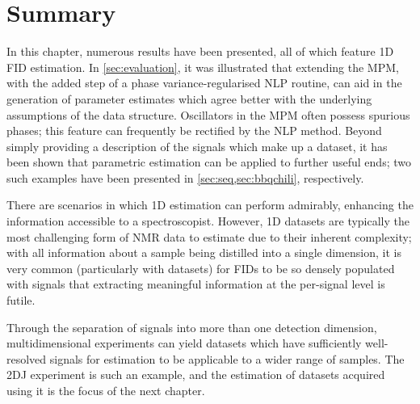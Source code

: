 \section{Summary}

In this chapter, numerous results have been presented, all of which feature
\ac{1D} \ac{FID} estimation.
In \cref{sec:evaluation}, it was illustrated that extending the \ac{MPM}, with
the added step of a phase variance-regularised \ac{NLP} routine, can
aid in the generation of parameter estimates which agree better with the
underlying assumptions of the data structure. Oscillators in the \ac{MPM} often
possess spurious phases; this feature can frequently be rectified by the
\ac{NLP} method. Beyond simply providing a description of the signals which
make up a dataset, it has been shown that parametric estimation can be applied
to further useful ends; two such examples have been presented in
\cref{sec:seq,sec:bbqchili}, respectively.

There are scenarios in which \ac{1D} estimation can perform admirably,
enhancing the information accessible to a spectroscopist. However,
\ac{1D} datasets are typically the most challenging form of \ac{NMR} data to
estimate due to their inherent complexity; with all information about a
sample being distilled into a single dimension, it is very common
(particularly with  datasets) for \acp{FID} to be so densely
populated with signals that extracting meaningful information at
the per-signal level is futile.
\label{corr:limited-scope}

Through the separation of signals into more than one detection dimension,
multidimensional experiments can yield datasets which have sufficiently
well-resolved signals for estimation to be applicable to a wider range of
samples. The \ac{2DJ} experiment is such an example, and the estimation of
datasets acquired using it is the focus of the next chapter.
